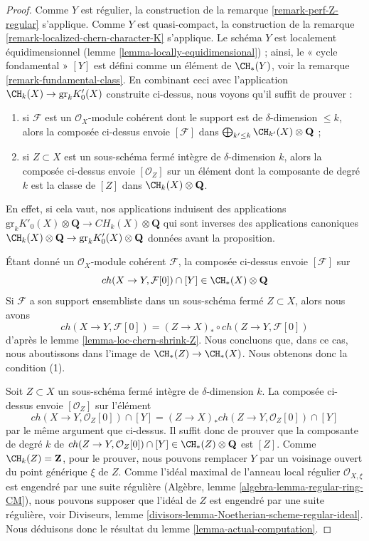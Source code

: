 \begin{proof}
Comme $Y$ est régulier, la construction de la
remarque \ref{remark-perf-Z-regular} s'applique.
Comme $Y$ est quasi-compact, la construction de la
remarque \ref{remark-localized-chern-character-K} s'applique.
Le schéma $Y$ est localement équidimensionnel
(lemme \ref{lemma-locally-equidimensional}) ; ainsi,
le « cycle fondamental » $[Y]$ est défini
comme un élément de $\CH_*(Y)$, voir la remarque \ref{remark-fundamental-class}.
En combinant ceci avec l'application $\CH_k(X) \to \text{gr}_kK'_0(X)$
construite ci-dessus, nous voyons qu'il suffit de prouver :
\begin{enumerate}
\item si $\mathcal{F}$ est un $\mathcal{O}_X$-module cohérent
dont le support est de $\delta$-dimension $\leq k$, alors
la composée ci-dessus envoie $[\mathcal{F}]$ dans
$\bigoplus_{k' \leq k} \CH_{k'}(X) \otimes \mathbf{Q}$ ;
\item si $Z \subset X$ est un sous-schéma fermé intègre
de $\delta$-dimension $k$, alors la composée ci-dessus
envoie $[\mathcal{O}_Z]$ sur un élément dont la composante de degré $k$
est la classe de $[Z]$ dans $\CH_k(X) \otimes \mathbf{Q}$.
\end{enumerate}
En effet, si cela vaut, nos applications induisent des applications
$\text{gr}_kK'_0(X) \otimes \mathbf{Q} \to CH_k(X) \otimes \mathbf{Q}$
qui sont inverses des applications canoniques
$\CH_k(X) \otimes \mathbf{Q} \to \text{gr}_k K'_0(X) \otimes \mathbf{Q}$
données avant la proposition.

\medskip\noindent
Étant donné un $\mathcal{O}_X$-module cohérent $\mathcal{F}$,
la composée ci-dessus envoie $[\mathcal{F}]$ sur
$$
ch(X \to Y, \mathcal{F}[0]) \cap [Y] \in \CH_*(X) \otimes \mathbf{Q}
$$
Si $\mathcal{F}$ a son support ensembliste dans un sous-schéma fermé
$Z \subset X$, alors nous avons
$$
ch(X \to Y, \mathcal{F}[0]) = (Z \to X)_* \circ ch(Z \to Y, \mathcal{F}[0])
$$
d'après le lemme \ref{lemma-loc-chern-shrink-Z}. Nous concluons que, dans ce
cas, nous aboutissons dans l'image de $\CH_*(Z) \to \CH_*(X)$. Nous obtenons donc
la condition (1).

\medskip\noindent
Soit $Z \subset X$ un sous-schéma fermé intègre de $\delta$-dimension $k$.
La composée ci-dessus envoie $[\mathcal{O}_Z]$ sur l'élément
$$
ch(X \to Y, \mathcal{O}_Z[0]) \cap [Y] =
(Z \to X)_* ch(Z \to Y, \mathcal{O}_Z[0]) \cap [Y]
$$
par le même argument que ci-dessus.
Il suffit donc de prouver que la composante de degré $k$ de
$ch(Z \to Y, \mathcal{O}_Z[0]) \cap [Y] \in
\CH_*(Z) \otimes \mathbf{Q}$ est $[Z]$.
Comme $\CH_k(Z) = \mathbf{Z}$, pour
le prouver, nous pouvons remplacer $Y$ par un voisinage ouvert du
point générique $\xi$ de $Z$. Comme l'idéal maximal de l'anneau
local régulier $\mathcal{O}_{X, \xi}$ est engendré par une
suite régulière (Algèbre, lemme \ref{algebra-lemma-regular-ring-CM}),
nous pouvons supposer que l'idéal de $Z$ est engendré par une suite régulière, voir
Diviseurs, lemme \ref{divisors-lemma-Noetherian-scheme-regular-ideal}.
Nous déduisons donc le résultat du lemme \ref{lemma-actual-computation}.
\end{proof}







